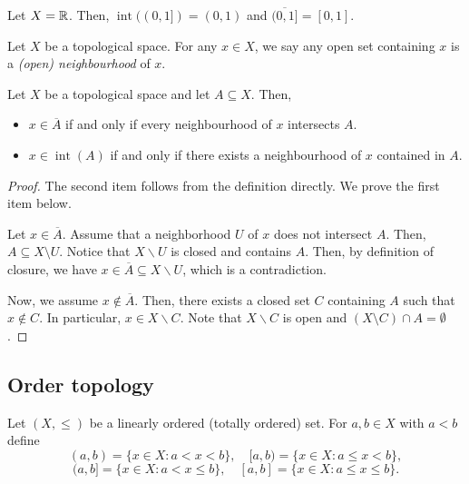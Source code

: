 \begin{example}
  Let $X=\mathbb{R}$. Then, $\operatorname{int}((0,1]) = (0,1)$ and $\overline{(0,1]} = [0,1]$.
\end{example}

\begin{definition}
  Let $X$ be a topological space. For any $x\in X$, we say any open set containing $x$ is a \emph{(open) neighbourhood} of $x$.
\end{definition}

\begin{theorem}
  Let $X$ be a topological space and let $A\subseteq X$. Then,
  \begin{itemize}
    \item $x\in \overline{A}$ if and only if every neighbourhood of $x$ intersects $A$.
    \item $x\in \operatorname{int}(A)$ if and only if there exists a neighbourhood of $x$ contained in $A$.
  \end{itemize}
\end{theorem}

\begin{proof}
  The second item follows from the definition directly. We prove the first item below. 

  Let $x\in \overline{A}$. Assume that a neighborhood $U$ of $x$ does not intersect $A$. Then, $A\subseteq X\setminus U$. Notice that $X\backslash U$ is closed and contains $A$. Then, by definition of closure, we have $x\in \overline{A}\subseteq X\backslash U$, which is a contradiction. 

  Now, we assume $x\notin \overline{A}$. Then, there exists a closed set $C$ containing $A$ such that $x\notin C$. In particular, $x\in X\backslash C$. Note that $X\backslash C$ is open and $(X\setminus C)\cap A = \emptyset$.
\end{proof}

\newpage

\subsection{Order topology}

\begin{definition}
Let $(X,\le)$ be a linearly ordered (totally ordered) set. For $a,b\in X$ with $a<b$ define
\[
(a,b)=\{x\in X: a<x<b\},\quad
[a,b)=\{x\in X: a\le x<b\},
\]
\[
(a,b]=\{x\in X: a<x\le b\},\quad
[a,b]=\{x\in X: a\le x\le b\}.
\]
\end{definition}

